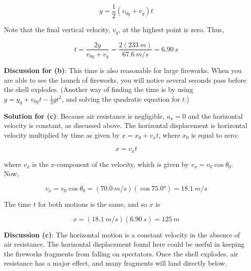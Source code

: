 \documentclass[../../main-ap-physics.tex]{subfiles}
\begin{document}
\begin{equation*}
    y = \frac{1}{2}\left(v_{0y} + v_y\right)t
\end{equation*}

Note that the final vertical velocity, $v_y$, at the highest point is zero. Thus,

\begin{equation*}
    t = \frac{2y}{v_{0y} + v_y} = \frac{2 \left(\SI{233}{m}\right)}{\SI{67.6}{m/s}} = \SI{6.90}{s}
\end{equation*}

\textbf{Discussion for (b)}: This time is also reasonable for large fireworks. When you are able to see the launch of fireworks, you will notice several seconds pass before the shell explodes. (Another way of finding the time is by using $y = y_0 + v_{0y} t - \frac{1}{2} g t^2$, and solving the quadratic equation for $t$.)

\vspace{1em}

\textbf{Solution for (c)}: Because air resistance is negligible, $a_x = 0$ and the horizontal velocity is constant, as discussed above. The horizontal displacement is horizontal velocity multiplied by time as given by $x = x_0 + v_x t$, where $x_0$ is equal to zero:

\begin{equation*}
    x = v_x t
\end{equation*}

where $v_x$ is the $x$-component of the velocity, which is given by $v_x = v_0 \cos{\theta_0}$. Now,

\begin{equation*}
    v_x = v_0 \cos{\theta_0} = \left(\SI{70.0}{m/s}\right) \left(\cos{\ang{75.0}}\right) = \SI{18.1}{m/s}
\end{equation*}

The time $t$ for both motions is the same, and so $x$ is

\begin{equation*}
    x = \left(\SI{18.1}{m/s}\right) \left(\SI{6.90}{s}\right) = \SI{125}{m}
\end{equation*}

\textbf{Discussion (c)}: The horizontal motion is a constant velocity in the absence of air resistance. The horizontal displacement found here could be useful in keeping the fireworks fragments from falling on spectators. Once the shell explodes, air resistance has a major effect, and many fragments will land directly below.
\end{document}
